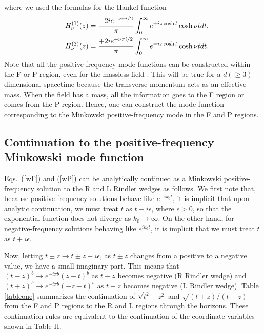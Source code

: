 \documentclass[aps,prd,preprintnumbers,nofootinbib,showpacs]{revtex4}%
\begin{document}
\begin{widetext}
where we used
the formulas for the Hankel function
\begin{eqnarray}
&&H^{(1)}_\nu(z)={-2ie^{-\nu\pi i/2}\over \pi}\int_0^\infty e^{+iz\cosh t}\cosh \nu t dt,
\\
&&H^{(2)}_\nu(z)={+2ie^{+\nu\pi i/2}\over \pi}\int_0^\infty e^{-iz\cosh t}\cosh \nu t dt.
\end{eqnarray}
Note that all the positive-frequency mode functions can be constructed within the F or P region,
even for the massless field \cite{Higuchi,Fulling,BD,Padmanabhan}. 
This will be true for a $d(\geq 3)$-dimensional
spacetime because the transverse momentum acts as an effective mass. 
When the field has a mass, all the information goes to the F region or comes from the P region.
Hence, one can construct the mode function corresponding to the Minkowski positive-frequency mode
in the F and P regions.


\subsection{Continuation to the positive-frequency Minkowski mode function}
Eqs.~(\ref{wF}) and (\ref{wP}) can be analytically continued as a 
Minkowski positive-frequency solution to the R and
L Rindler wedges as follows. We first note that, because positive-frequency solutions behave 
like $e^{-ik_0 t}$, it is implicit that upon analytic continuation,
we must treat $t$ as $t-i\epsilon$, where $\epsilon > 0$, so that the exponential function does 
not diverge as $k_0\to\infty$. On the other hand, for negative-frequency solutions behaving 
like $e^{ik_0 t}$, it is implicit that we must treat $t$ as $t+i\epsilon$.

Now, letting $t\pm z \to t \pm z -i\epsilon$, as $t\pm z$ changes from a positive to a negative value, 
we have a small imaginary part. This means that
$(t - z)^b \to e^{-i\pi b}(z-t)^b$ as $t-z$ becomes negative (R Rindler wedge) and
$(t+z)^b \to e^{-i\pi b}(-z-t)^b$ as $t+z$ becomes negative (L Rindler wedge).  
Table \ref{tableone} summarizes the continuation of $\sqrt{t^2-z^2}$ and 
$\sqrt{(t+z)/(t-z)}$ from the F and P regions to the R and L regions through the horizons.
These continuation rules are equivalent to the continuation of the coordinate variables 
shown in Table II.


\end{widetext}
\end{document}
